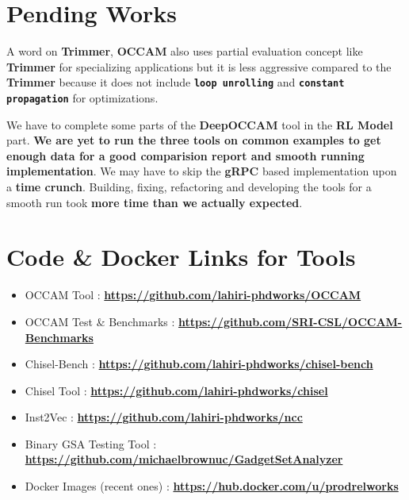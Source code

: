 \documentclass{article} %
\begin{document}
\section*{\color{darkmidnightblue} Pending Works} 
A word on \textbf{Trimmer}, \textbf{OCCAM} also uses partial evaluation concept like \textbf{Trimmer} for specializing applications but it is less aggressive compared to the  \textbf{Trimmer} because it does not include \textbf{\texttt{loop unrolling}} and \textbf{\texttt{constant propagation}} for optimizations. 

We have to complete some parts of the \textbf{DeepOCCAM} tool in the \textbf{RL Model} part. \textbf{We are yet to run the three tools on common examples to get enough data for a good comparision report and smooth running implementation}. We may have to skip the \textbf{gRPC} based implementation upon a \textbf{time crunch}. Building, fixing, refactoring and developing the tools for a smooth run took \textbf{\color{red} more time than we actually expected}. 

\section*{Code \& Docker Links for Tools}
\begin{itemize}
	\item OCCAM Tool : \textbf{\href{https://github.com/lahiri-phdworks/OCCAM} {https://github.com/lahiri-phdworks/OCCAM}}
	\item OCCAM Test \& Benchmarks : \textbf{\href{https://github.com/lahiri-phdworks/OCCAM-Benchmarks} {https://github.com/SRI-CSL/OCCAM-Benchmarks}}
	\item Chisel-Bench : \textbf{\href{https://github.com/lahiri-phdworks/chisel-bench} {https://github.com/lahiri-phdworks/chisel-bench}}
	\item Chisel Tool : \textbf{\href{https://github.com/lahiri-phdworks/chisel} {https://github.com/lahiri-phdworks/chisel}}
	\item Inst2Vec : \textbf{\href{https://github.com/lahiri-phdworks/ncc} {https://github.com/lahiri-phdworks/ncc}}
	\item Binary GSA Testing Tool : \textbf{\href{https://github.com/michaelbrownuc/GadgetSetAnalyzer} {https://github.com/michaelbrownuc/GadgetSetAnalyzer}}
	\item Docker Images (recent ones) : \textbf{\href{https://hub.docker.com/u/prodrelworks} {https://hub.docker.com/u/prodrelworks}}
\end{itemize}
\end{document}
